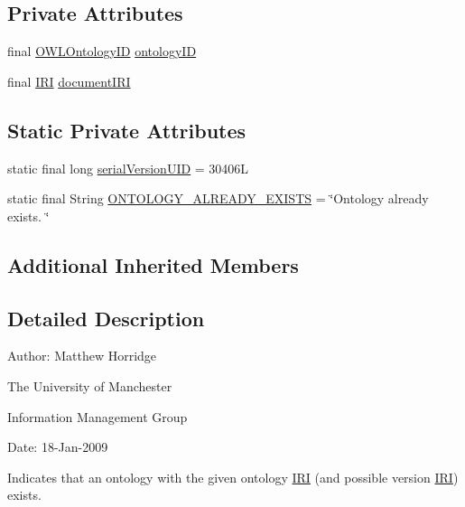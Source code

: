 \subsection*{Private Attributes}
\begin{DoxyCompactItemize}
\item 
final \hyperlink{classorg_1_1semanticweb_1_1owlapi_1_1model_1_1_o_w_l_ontology_i_d}{O\-W\-L\-Ontology\-I\-D} \hyperlink{classorg_1_1semanticweb_1_1owlapi_1_1model_1_1_o_w_l_ontology_already_exists_exception_a459a09b8b7bd53ea758f93cffc08c76e}{ontology\-I\-D}
\item 
final \hyperlink{classorg_1_1semanticweb_1_1owlapi_1_1model_1_1_i_r_i}{I\-R\-I} \hyperlink{classorg_1_1semanticweb_1_1owlapi_1_1model_1_1_o_w_l_ontology_already_exists_exception_a153a29230e5a16da265d6fcc4899aadd}{document\-I\-R\-I}
\end{DoxyCompactItemize}
\subsection*{Static Private Attributes}
\begin{DoxyCompactItemize}
\item 
static final long \hyperlink{classorg_1_1semanticweb_1_1owlapi_1_1model_1_1_o_w_l_ontology_already_exists_exception_a57552fbb96993dae87aa5990ea8e0230}{serial\-Version\-U\-I\-D} = 30406\-L
\item 
static final String \hyperlink{classorg_1_1semanticweb_1_1owlapi_1_1model_1_1_o_w_l_ontology_already_exists_exception_a0004513d971ac1aaae15dc342df98416}{O\-N\-T\-O\-L\-O\-G\-Y\-\_\-\-A\-L\-R\-E\-A\-D\-Y\-\_\-\-E\-X\-I\-S\-T\-S} = \char`\"{}Ontology already exists. \char`\"{}
\end{DoxyCompactItemize}
\subsection*{Additional Inherited Members}


\subsection{Detailed Description}
Author\-: Matthew Horridge\par
 The University of Manchester\par
 Information Management Group\par
 Date\-: 18-\/\-Jan-\/2009 

Indicates that an ontology with the given ontology \hyperlink{classorg_1_1semanticweb_1_1owlapi_1_1model_1_1_i_r_i}{I\-R\-I} (and possible version \hyperlink{classorg_1_1semanticweb_1_1owlapi_1_1model_1_1_i_r_i}{I\-R\-I}) exists. 

